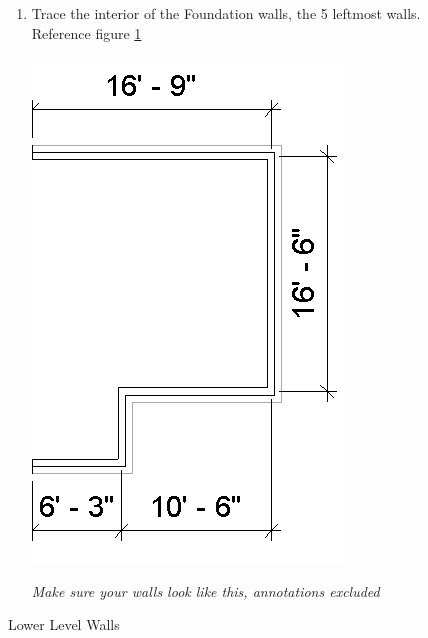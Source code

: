 \documentclass{tufte-book} %
\begin{document}
\begin{figure}
\begin{enumerate}
	\item Trace the interior of the Foundation walls, the 5 leftmost walls. Reference figure \ref{fig:revlowlvlwalls}
	
	\begin{marginfigure}
		\includegraphics[width=\linewidth]{revitlowerlevelwalls.png}
		\caption{Lower Level Walls}
		\emph{Make sure your walls look like this, annotations excluded}
		\label{fig:revlowlvlwalls}
	\end{marginfigure}
	
	\clearpage
	

\end{enumerate}
\end{figure}
\end{document}
